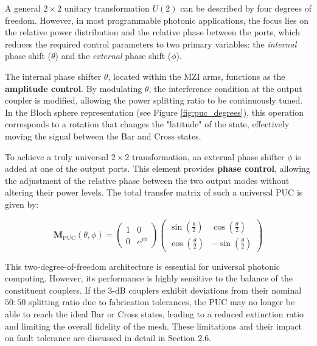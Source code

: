 A general $2 \times 2$ unitary transformation $U(2)$ can be described by four degrees of freedom. 
However, in most programmable photonic applications, the focus lies on the relative power 
distribution and the relative phase between the ports, which reduces the required control parameters 
to two primary variables: the \textit{internal} phase shift ($\theta$) and the \textit{external} 
phase shift ($\phi$).

The internal phase shifter $\theta$, located within the MZI arms, functions as the 
\textbf{amplitude control}. By modulating $\theta$, the interference condition at the output 
coupler is modified, allowing the power splitting ratio to be continuously tuned. In the Bloch 
sphere representation (see Figure \ref{fig:puc_degrees}), this operation corresponds to a rotation 
that changes the "latitude" of the state, effectively moving the signal between the Bar and Cross 
states.

To achieve a truly universal $2 \times 2$ transformation, an external phase shifter $\phi$ is added 
at one of the output ports. This element provides \textbf{phase control}, allowing the adjustment 
of the relative phase between the two output modes without altering their power levels. The total 
transfer matrix of such a universal PUC is given by:

\begin{equation}
\mathbf{M}_{\text{PUC}}(\theta, \phi) = 
\begin{pmatrix} 1 & 0 \\ 0 & e^{j\phi} \end{pmatrix} 
\begin{pmatrix} 
\sin\left(\frac{\theta}{2}\right) & \cos\left(\frac{\theta}{2}\right) \\[10pt] 
\cos\left(\frac{\theta}{2}\right) & -\sin\left(\frac{\theta}{2}\right) 
\end{pmatrix}
\label{eq:universal_puc}
\end{equation}

This two-degree-of-freedom architecture is essential for universal photonic computing. However, its 
performance is highly sensitive to the balance of the constituent couplers. If the $3$-dB couplers 
exhibit deviations from their nominal $50:50$ splitting ratio due to fabrication tolerances, the 
PUC may no longer be able to reach the ideal Bar or Cross states, leading to a reduced extinction 
ratio and limiting the overall fidelity of the mesh. These limitations and their impact on fault 
tolerance are discussed in detail in Section 2.6.


